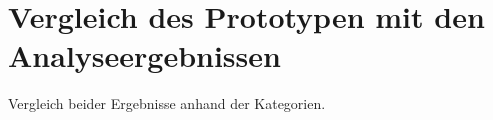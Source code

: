 \section{Vergleich des Prototypen mit den Analyseergebnissen}
\label{sec:comparison}
    Vergleich beider Ergebnisse anhand der Kategorien.

    
    